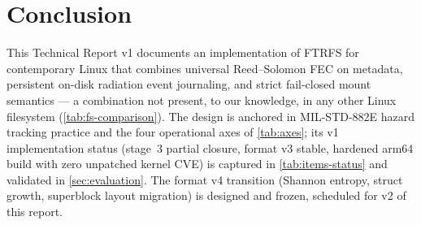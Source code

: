 \section{Conclusion}\label{sec:conclusion}

This Technical Report v1 documents an implementation of FTRFS for
contemporary Linux that combines universal Reed--Solomon FEC on
metadata, persistent on-disk radiation event journaling, and
strict fail-closed mount semantics --- a combination not present,
to our knowledge, in any other Linux filesystem
(\cref{tab:fs-comparison}). The design is anchored in
MIL-STD-882E hazard tracking practice and the four operational
axes of \cref{tab:axes}; its v1 implementation status
(stage~3 partial closure, format v3 stable, hardened arm64 build
with zero unpatched kernel CVE) is captured in
\cref{tab:items-status} and validated in
\cref{sec:evaluation}. The format v4 transition (Shannon
entropy, struct growth, superblock layout migration) is designed
and frozen, scheduled for v2 of this report.
